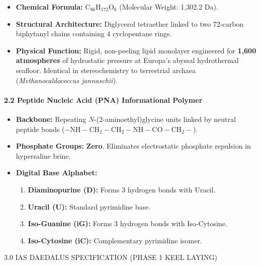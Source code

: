 \documentclass[12pt,twoside,openright]{book}
\newcommand{\sceneheader}[1]{%
  \par\vspace{1.8em}%
  {\noindent\centering\scshape\large #1\par}%
  \vspace{1.0em}%
  \noindent%
}
\newcommand{\dinkus}{%
  \par\vspace{1.2em}%
  {\noindent\centering{\large $\ast\quad\ast\quad\ast$}\par}%
  \vspace{1.2em}%
  \noindent%
}
\providecommand{\tightlist}{\setlength{\itemsep}{0pt}\setlength{\parskip}{0pt}
\setlength{\tabcolsep}{2pt}}
\begin{document}
\begin{itemize}
\tightlist
\item
  \textbf{Chemical Formula:} \(\text{C}_{86}\text{H}_{172}\text{O}_6\)
  (Molecular Weight: 1,302.2 Da).
\item
  \textbf{Structural Architecture:} Diglycerol tetraether linked to two
  72-carbon biphytanyl chains containing 4 cyclopentane rings.
\item
  \textbf{Physical Function:} Rigid, non-peeling lipid monolayer
  engineered for \textbf{1,600 atmospheres} of hydrostatic pressure at
  Europa's abyssal hydrothermal seafloor. Identical in stereochemistry
  to terrestrial archaea (\emph{Methanocaldococcus jannaschii}).
\end{itemize}

\paragraph{2.2 Peptide Nucleic Acid (PNA) Informational
Polymer}\label{peptide-nucleic-acid-pna-informational-polymer}

\begin{itemize}
\tightlist
\item
  \textbf{Backbone:} Repeating \(N\)-(2-aminoethyl)glycine units linked
  by neutral peptide bonds
  (\(-\text{NH}-\text{CH}_2-\text{CH}_2-\text{NH}-\text{CO}-\text{CH}_2-\)).
\item
  \textbf{Phosphate Groups:} \textbf{Zero}. Eliminates electrostatic
  phosphate repulsion in hypersaline brine.
\item
  \textbf{Digital Base Alphabet:}

  \begin{enumerate}
  \def\labelenumi{\arabic{enumi}.}
  \tightlist
  \item
    \textbf{Diaminopurine (D):} Forms 3 hydrogen bonds with Uracil.
  \item
    \textbf{Uracil (U):} Standard pyrimidine base.
  \item
    \textbf{Iso-Guanine (iG):} Forms 3 hydrogen bonds with Iso-Cytosine.
  \item
    \textbf{Iso-Cytosine (iC):} Complementary pyrimidine isomer.
  \end{enumerate}
\end{itemize}

\dinkus

\sceneheader{3.0 IAS DAEDALUS SPECIFICATION (PHASE 1 KEEL
LAYING)}
\end{document}
